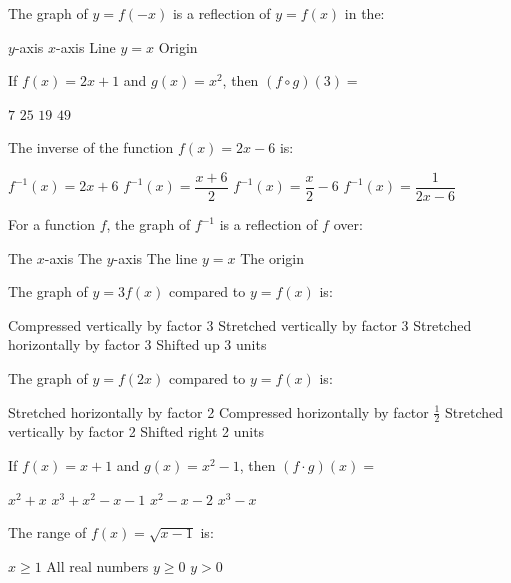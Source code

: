 \documentclass[addpoints]{exam}
\begin{document}
\begin{questions}
\question[1] The graph of $y = f(-x)$ is a reflection of $y = f(x)$ in the:
\begin{choices}
    \correctchoice $y$-axis
    \choice $x$-axis
    \choice Line $y = x$
    \choice Origin
\end{choices}

\question[1] If $f(x) = 2x + 1$ and $g(x) = x^2$, then $(f \circ g)(3) =$
\begin{choices}
    \choice $7$
    \choice $25$
    \correctchoice $19$
    \choice $49$
\end{choices}

\question[1] The inverse of the function $f(x) = 2x - 6$ is:
\begin{choices}
    \choice $f^{-1}(x) = 2x + 6$
    \correctchoice $f^{-1}(x) = \dfrac{x+6}{2}$
    \choice $f^{-1}(x) = \dfrac{x}{2} - 6$
    \choice $f^{-1}(x) = \dfrac{1}{2x-6}$
\end{choices}

\question[1] For a function $f$, the graph of $f^{-1}$ is a reflection of $f$ over:
\begin{choices}
    \choice The $x$-axis
    \choice The $y$-axis
    \correctchoice The line $y = x$
    \choice The origin
\end{choices}

\question[1] The graph of $y = 3f(x)$ compared to $y = f(x)$ is:
\begin{choices}
    \choice Compressed vertically by factor 3
    \correctchoice Stretched vertically by factor 3
    \choice Stretched horizontally by factor 3
    \choice Shifted up 3 units
\end{choices}

\question[1] The graph of $y = f(2x)$ compared to $y = f(x)$ is:
\begin{choices}
    \choice Stretched horizontally by factor 2
    \correctchoice Compressed horizontally by factor $\tfrac{1}{2}$
    \choice Stretched vertically by factor 2
    \choice Shifted right 2 units
\end{choices}

\question[1] If $f(x) = x + 1$ and $g(x) = x^2 - 1$, then $(f \cdot g)(x) =$
\begin{choices}
    \choice $x^2 + x$
    \correctchoice $x^3 + x^2 - x - 1$
    \choice $x^2 - x - 2$
    \choice $x^3 - x$
\end{choices}

\question[1] The range of $f(x) = \sqrt{x - 1}$ is:
\begin{choices}
    \choice $x \geq 1$
    \choice All real numbers
    \correctchoice $y \geq 0$
    \choice $y > 0$
\end{choices}



\end{questions}
\end{document}
